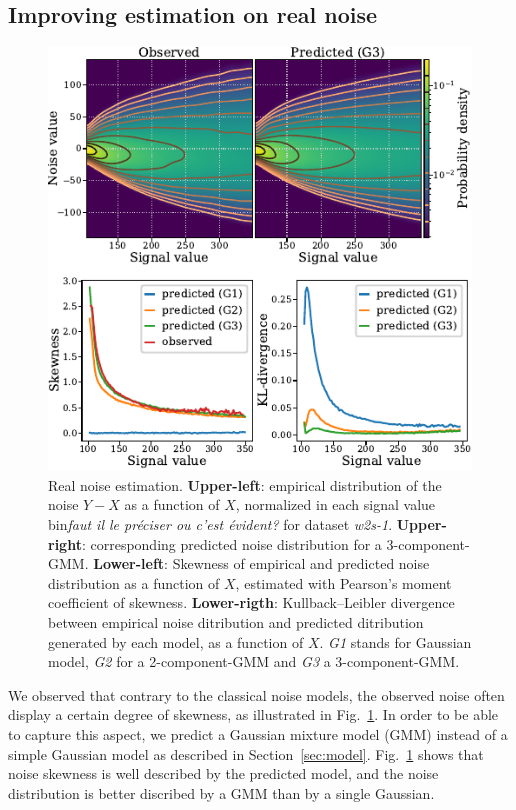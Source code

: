 \documentclass{article}
\begin{document}
\subsection{Improving estimation on real noise}
\begin{figure}[ht]
\vskip 0.2in
\begin{center}
\centerline{\includegraphics[width=\columnwidth]{fig_skewness.pdf}}
\caption{Real noise estimation. \textbf{Upper-left}: empirical distribution of the noise $Y - X$ as a function of $X$, normalized in each signal value bin\textit{faut il le préciser ou c'est évident?} for dataset \textit{w2s-1}.
\textbf{Upper-right}: corresponding predicted noise distribution for a 3-component-GMM.
\textbf{Lower-left}: Skewness of empirical and predicted noise distribution as a function of $X$, estimated with Pearson's moment coefficient of skewness\footnotemark.
\textbf{Lower-rigth}:  Kullback–Leibler divergence between empirical noise ditribution and predicted ditribution generated by each model, as a function of $X$.
\textit{G1} stands for Gaussian model, \textit{G2} for a 2-component-GMM and \textit{G3} a 3-component-GMM.
}
\label{fig:skewness}
\end{center}
\vskip -0.2in
\end{figure}
We observed that contrary to the classical noise models, the observed noise often display a certain degree of skewness, as illustrated in Fig.~\ref{fig:skewness}.
In order to be able to capture this aspect, we predict a Gaussian mixture model (GMM) instead of a simple Gaussian model as described in Section~\ref{sec:model}. Fig.~\ref{fig:skewness} shows that noise skewness is well described by the predicted model, and the noise distribution is better discribed by a GMM than by a single Gaussian.
\end{document}
